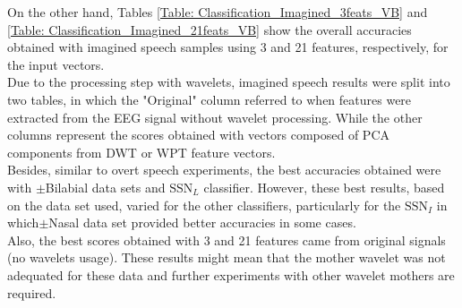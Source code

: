 On the other hand, Tables \ref{Table: Classification_Imagined_3feats_VB} and \ref{Table: Classification_Imagined_21feats_VB} show the overall accuracies obtained with imagined speech samples using 3 and 21 features, respectively, for the input vectors.\\

Due to the processing step with wavelets, imagined speech results were split into two tables, in which the "Original" column referred to when features were extracted from the EEG signal without wavelet processing. While the other columns represent the scores obtained with vectors composed of PCA components from DWT or WPT feature vectors.\\

Besides, similar to overt speech experiments, the best accuracies obtained were with $\pm$Bilabial data sets and $\mbox{SSN}_{L}$ classifier. However, these best results, based on the data set used, varied for the other classifiers, particularly for the $\mbox{SSN}_{I}$ in which$\pm$Nasal data set provided better accuracies in some cases.\\

Also, the best scores obtained with 3 and 21 features came from original signals (no wavelets usage). These results might mean that the mother wavelet was not adequated for these data and further experiments with other wavelet mothers are required.\\

